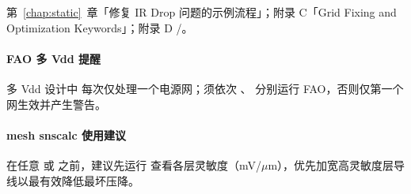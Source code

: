 \begin{seeAlsoBox}
第~\ref{chap:static}~章「修复 IR Drop 问题的示例流程」；附录 C「Grid Fixing and Optimization Keywords」；附录 D /。
\end{seeAlsoBox}

\paragraph{FAO 多 Vdd 提醒}
多 Vdd 设计中  每次仅处理一个电源网；须依次 、 分别运行 FAO，否则仅第一个网生效并产生警告。

\paragraph{mesh snscalc 使用建议}
在任意  或  之前，建议先运行  查看各层灵敏度（mV/$\mu$m），优先加宽高灵敏度层导线以最有效降低最坏压降。

